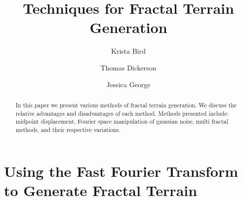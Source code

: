 \documentclass{article}
\title{Techniques for Fractal Terrain Generation}
\author{Krista Bird \and Thomas Dickerson \and Jessica George}
\begin{document}
    \maketitle

     \begin{abstract}
     In this paper we present various methods of fractal terrain generation. We discuss the relative advantages and disadvantages of each method. Methods presented include: midpoint displacement, Fourier space manipulation of gaussian noise, multi fractal methods, and their respective variations. 
     \end{abstract}

\section{Using the Fast Fourier Transform to Generate Fractal Terrain} 
\label{sec:FFT}
\end{document}
